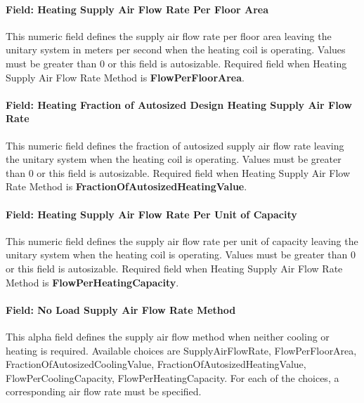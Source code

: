 \paragraph{Field: Heating Supply Air Flow Rate Per Floor Area}\label{field-heating-supply-air-flow-rate-per-floor-area}

This numeric field defines the supply air flow rate per floor area leaving the unitary system in meters per second when the heating coil is operating. Values must be greater than 0 or this field is autosizable. Required field when Heating Supply Air Flow Rate Method is \textbf{FlowPerFloorArea}.

\paragraph{Field: Heating Fraction of Autosized Design Heating Supply Air Flow Rate}\label{field-heating-fraction-of-autosized-design-heating-supply-air-flow-rate}

This numeric field defines the fraction of autosized supply air flow rate leaving the unitary system when the heating coil is operating. Values must be greater than 0 or this field is autosizable. Required field when Heating Supply Air Flow Rate Method is \textbf{FractionOfAutosizedHeatingValue}.

\paragraph{Field: Heating Supply Air Flow Rate Per Unit of Capacity}\label{field-heating-supply-air-flow-rate-per-unit-of-capacity}

This numeric field defines the supply air flow rate per unit of capacity leaving the unitary system when the heating coil is operating. Values must be greater than 0 or this field is autosizable. Required field when Heating Supply Air Flow Rate Method is \textbf{FlowPerHeatingCapacity}.

\paragraph{Field: No Load Supply Air Flow Rate Method}\label{field-no-load-supply-air-flow-rate-method}

This alpha field defines the supply air flow method when neither cooling or heating is required. Available choices are SupplyAirFlowRate, FlowPerFloorArea, FractionOfAutosizedCoolingValue, FractionOfAutosizedHeatingValue, FlowPerCoolingCapacity, FlowPerHeatingCapacity. For each of the choices, a corresponding air flow rate must be specified.

